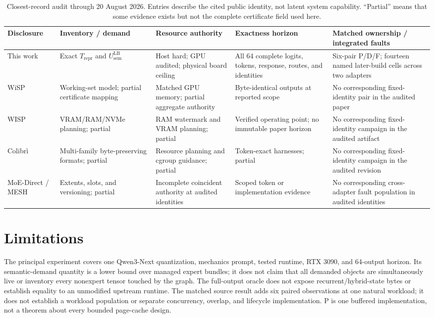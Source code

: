 \documentclass[letterpaper,twocolumn,10pt]{article}
\begin{document}
\begin{table}[t]
  \centering
  \scriptsize
  \caption{Closest-record audit through 20 August 2026.  Entries describe the
  cited public identity, not latent system capability.  ``Partial'' means that
  some evidence exists but not the complete certificate field used here.}
  \label{tab:relatedmatrix}
  \begin{tabularx}{\textwidth}{@{}p{2.3cm}p{2.7cm}p{3.0cm}p{2.7cm}X@{}}
    \toprule
    Disclosure & Inventory / demand & Resource authority & Exactness horizon &
      Matched ownership / integrated faults \\
    \midrule
    This work & Exact $T_{\mathrm{repr}}$ and $U_{\mathrm{sem}}^{\mathrm{LB}}$
      & Host hard; GPU audited; physical board ceiling & All 64 complete logits,
      tokens, response, routes, and identities & Six-pair P/D/F; fourteen named
      later-build cells across two adapters \\
    WiSP~\cite{wisppaper} & Working-set model; partial certificate mapping &
      Matched GPU memory; partial aggregate authority & Byte-identical outputs
      at reported scope & No corresponding fixed-identity pair in the audited paper \\
    WISP~\cite{wispengine} & VRAM/RAM/NVMe planning; partial & RAM watermark and
      VRAM planning; partial & Verified operating point; no immutable paper
      horizon & No corresponding fixed-identity campaign in the audited artifact \\
    Colibr\`i~\cite{colibri} & Multi-family byte-preserving formats; partial &
      Resource planning and cgroup guidance; partial & Token-exact harnesses;
      partial & No corresponding fixed-identity campaign in the audited revision \\
    MoE-Direct / MESH~\cite{moedirect,mesh} & Extents, slots, and versioning;
      partial & Incomplete coincident authority at audited identities & Scoped
      token or implementation evidence & No corresponding cross-adapter fault
      population in audited identities \\
    \bottomrule
  \end{tabularx}
\end{table}

\section{Limitations}
\label{sec:limitations}

The principal experiment covers one Qwen3-Next quantization, mechanics prompt, tested
runtime, RTX 3090, and 64-output horizon.  Its semantic-demand quantity is a
lower bound over managed expert bundles; it does not claim that all demanded
objects are simultaneously live or inventory every nonexpert tensor touched by
the graph.  The full-output oracle does not expose recurrent/hybrid-state bytes
or establish equality to an unmodified upstream runtime.
The matched source result adds six paired observations at one natural workload;
it does not establish a workload population or separate concurrency, overlap,
and lifecycle implementation.  P is one buffered implementation, not a theorem
about every bounded page-cache design.
\end{document}
